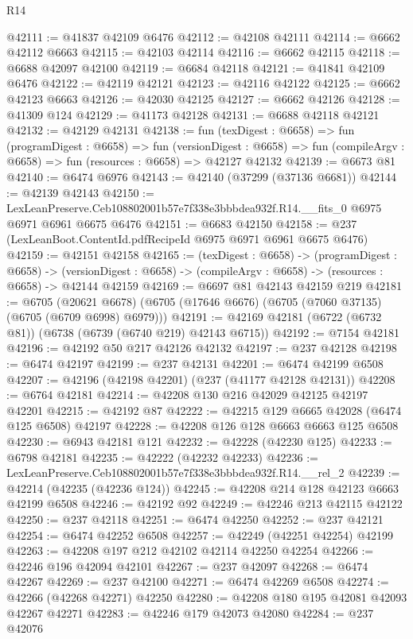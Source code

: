 \begin{lexlean}{R14}
\begin{coremodule}
@42111 := @41837 @42109 @6476
@42112 := @42108 @42111
@42114 := @6662 @42112 @6663
@42115 := @42103 @42114
@42116 := @6662 @42115
@42118 := @6688 @42097 @42100
@42119 := @6684 @42118
@42121 := @41841 @42109 @6476
@42122 := @42119 @42121
@42123 := @42116 @42122
@42125 := @6662 @42123 @6663
@42126 := @42030 @42125
@42127 := @6662 @42126
@42128 := @41309 @124
@42129 := @41173 @42128
@42131 := @6688 @42118 @42121
@42132 := @42129 @42131
@42138 := fun (texDigest : @6658) =>
  fun (programDigest : @6658) =>
  fun (versionDigest : @6658) =>
  fun (compileArgv : @6658) => fun (resources : @6658) => @42127 @42132
@42139 := @6673 @81
@42140 := @6474 @6976
@42143 := @42140 (@37299 (@37136 @6681))
@42144 := @42139 @42143
@42150 := LexLeanPreserve.Ceb108802001b57e7f338e3bbbdea932f.R14.__fits_0
    @6975
    @6971
    @6961
    @6675
    @6476
@42151 := @6683 @42150
@42158 := @237 (LexLeanBoot.ContentId.pdfRecipeId @6975 @6971 @6961 @6675 @6476)
@42159 := @42151 @42158
@42165 := (texDigest : @6658) ->
  (programDigest : @6658) ->
  (versionDigest : @6658) -> (compileArgv : @6658) -> (resources : @6658) -> @42144 @42159
@42169 := @6697 @81 @42143 @42159 @219
@42181 := @6705
    (@20621 @6678)
    (@6705 (@17646 @6676) (@6705 (@7060 @37135) (@6705 (@6709 @6998) @6979)))
@42191 := @42169 @42181 (@6722 (@6732 @81)) (@6738 (@6739 (@6740 @219) @42143 @6715))
@42192 := @7154 @42181
@42196 := @42192 @50 @217 @42126 @42132
@42197 := @237 @42128
@42198 := @6474 @42197
@42199 := @237 @42131
@42201 := @6474 @42199 @6508
@42207 := @42196 (@42198 @42201) (@237 (@41177 @42128 @42131))
@42208 := @6764 @42181
@42214 := @42208 @130 @216 @42029 @42125 @42197 @42201
@42215 := @42192 @87
@42222 := @42215 @129 @6665 @42028 (@6474 @125 @6508) @42197
@42228 := @42208 @126 @128 @6663 @6663 @125 @6508
@42230 := @6943 @42181 @121
@42232 := @42228 (@42230 @125)
@42233 := @6798 @42181
@42235 := @42222 (@42232 @42233)
@42236 := LexLeanPreserve.Ceb108802001b57e7f338e3bbbdea932f.R14.__rel_2
@42239 := @42214 (@42235 (@42236 @124))
@42245 := @42208 @214 @128 @42123 @6663 @42199 @6508
@42246 := @42192 @92
@42249 := @42246 @213 @42115 @42122
@42250 := @237 @42118
@42251 := @6474 @42250
@42252 := @237 @42121
@42254 := @6474 @42252 @6508
@42257 := @42249 (@42251 @42254) @42199
@42263 := @42208 @197 @212 @42102 @42114 @42250 @42254
@42266 := @42246 @196 @42094 @42101
@42267 := @237 @42097
@42268 := @6474 @42267
@42269 := @237 @42100
@42271 := @6474 @42269 @6508
@42274 := @42266 (@42268 @42271) @42250
@42280 := @42208 @180 @195 @42081 @42093 @42267 @42271
@42283 := @42246 @179 @42073 @42080
@42284 := @237 @42076

\end{coremodule}
\end{lexlean}
